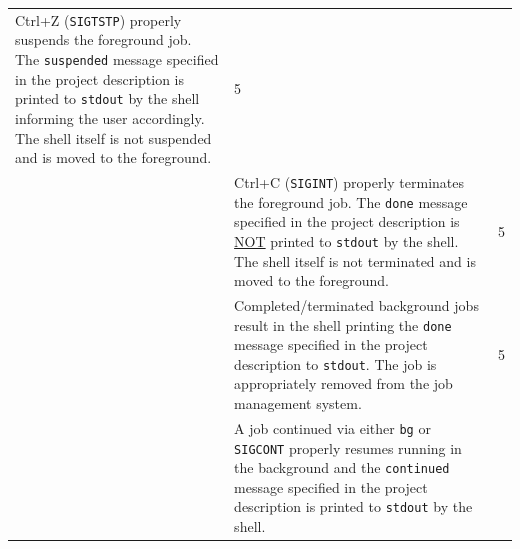 \documentclass[10pt]{article}
\newcommand{\checkbox}[0]{\makebox[0pt][l]{$\square$}\raisebox{.15ex}{\hspace{0.1em}}}
\begin{document}
\begin{longtable}[c]{@{}lll@{}}
\begin{minipage}[t]{0.74\columnwidth}
Ctrl+Z (\texttt{SIGTSTP}) properly suspends the foreground job. The
\texttt{suspended} message specified in the project description is printed to
\texttt{stdout} by the shell informing the user accordingly. The shell
itself is not suspended and is moved to the foreground.
\end{minipage} & \begin{minipage}[t]{0.11\columnwidth}\raggedright
5
\end{minipage}
\\\addlinespace\hline\addlinespace
\begin{minipage}[t]{0.06\columnwidth}\raggedright
\end{minipage} \checkbox & \begin{minipage}[t]{0.74\columnwidth}\raggedright
Ctrl+C (\texttt{SIGINT}) properly terminates the foreground job. The
\texttt{done} message specified in the project description is \underline{NOT}
printed to \texttt{stdout} by the shell.  The shell itself is not
terminated and is moved to the foreground.
\end{minipage} & \begin{minipage}[t]{0.11\columnwidth}\raggedright
5
\end{minipage}
\\\addlinespace\hline\addlinespace
\begin{minipage}[t]{0.06\columnwidth}\raggedright
\end{minipage} \checkbox & \begin{minipage}[t]{0.74\columnwidth}\raggedright
Completed/terminated background jobs result in the shell printing the
\texttt{done} message specified in the project description to \texttt{stdout}.
The job is appropriately removed from the job management system.
\end{minipage} & \begin{minipage}[t]{0.11\columnwidth}\raggedright
5
\end{minipage}
\\\addlinespace\hline\addlinespace
\begin{minipage}[t]{0.06\columnwidth}\raggedright
\end{minipage} \checkbox & \begin{minipage}[t]{0.74\columnwidth}\raggedright
A job continued via either \texttt{bg} or \texttt{SIGCONT} properly
resumes running in the background and the \texttt{continued} message
specified in the project description is printed to \texttt{stdout} by
the shell.
\end{minipage} & \begin{minipage}[t]{0.11\columnwidth}\raggedright

\end{minipage}
\end{longtable}
\end{document}
